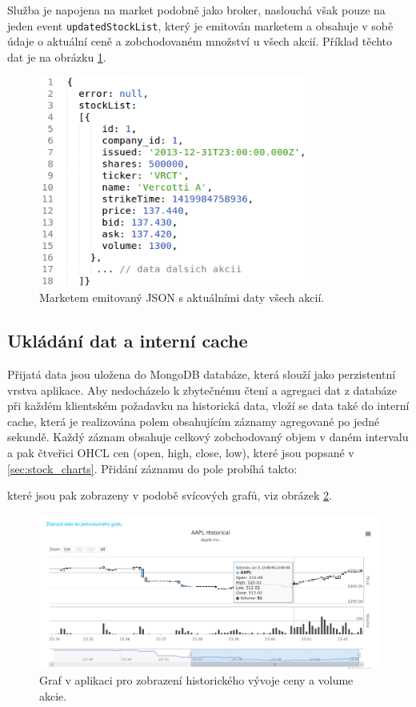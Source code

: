 \documentclass[thesis=M,czech]{FITthesis}[2012/06/26]
\begin{document}
	Služba je napojena na market podobně jako broker, naslouchá však pouze na jeden event \texttt{updatedStockList}, který je emitován marketem a obsahuje v sobě údaje o aktuální ceně a zobchodovaném množství u všech akcií. Příklad těchto dat je na obrázku \ref{fig:stock_list_data}.
	
\begin{figure}[h]
	\centering
	\includegraphics[width=0.8\textwidth]{images/stock_snapshot_data}
 	\caption[Atuální data akcií na burze]{Marketem emitovaný JSON s aktuálními daty všech akcií.}
 	\label{fig:stock_list_data} 	
\end{figure}

\subsection{Ukládání dat a interní cache}

	Přijatá data jsou uložena do MongoDB databáze, která slouží jako perzistentní vrstva aplikace. Aby nedocházelo k zbytečnému čtení a agregaci dat z databáze při  každém klientském požadavku na historická data, vloží se data také do interní cache, která je realizována polem obsahujícím záznamy agregované po jedné sekundě. Každý záznam obsahuje celkový zobchodovaný objem v daném intervalu a pak čtveřici OHCL cen (open, high, close, low), které jsou popsané v \ref{sec:stock_charts}. 
	Přidání záznamu do pole probíhá takto:


	které jsou pak zobrazeny v podobě svícových grafů, viz obrázek \ref{fig:ohlc_chart}.
	
\begin{figure}[h]
	\centering
	\includegraphics[width=1\textwidth]{images/chart_service}
 	\caption[Grafy vývoje ceny a volume v aplikaci]{Graf v aplikaci pro zobrazení historického vývoje ceny a volume akcie.}
 	\label{fig:ohlc_chart} 	
\end{figure}
		
\end{document}
